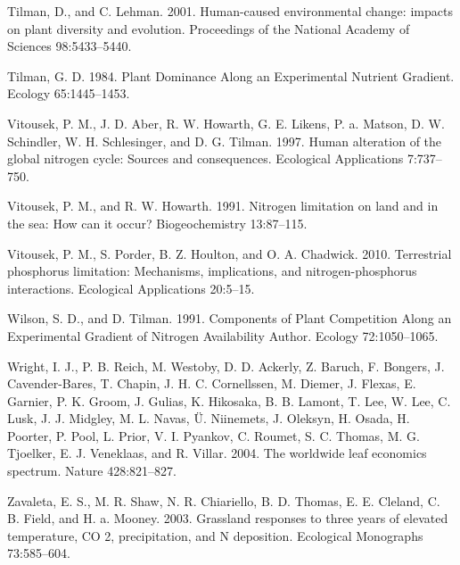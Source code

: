 \documentclass[twoside,12pt,final]{ucthesis-CA2012}
\begin{document}
\begin{ucmainmatter}
\leavevmode\hypertarget{ref-Tilman2001}{}%
Tilman, D., and C. Lehman. 2001. Human-caused environmental change: impacts on plant diversity and evolution. Proceedings of the National Academy of Sciences 98:5433--5440.

\leavevmode\hypertarget{ref-Tilman1984}{}%
Tilman, G. D. 1984. Plant Dominance Along an Experimental Nutrient Gradient. Ecology 65:1445--1453.

\leavevmode\hypertarget{ref-Vitousek1997b}{}%
Vitousek, P. M., J. D. Aber, R. W. Howarth, G. E. Likens, P. a. Matson, D. W. Schindler, W. H. Schlesinger, and D. G. Tilman. 1997. Human alteration of the global nitrogen cycle: Sources and consequences. Ecological Applications 7:737--750.

\leavevmode\hypertarget{ref-Vitousek1991}{}%
Vitousek, P. M., and R. W. Howarth. 1991. Nitrogen limitation on land and in the sea: How can it occur? Biogeochemistry 13:87--115.

\leavevmode\hypertarget{ref-Vitousek2010}{}%
Vitousek, P. M., S. Porder, B. Z. Houlton, and O. A. Chadwick. 2010. Terrestrial phosphorus limitation: Mechanisms, implications, and nitrogen-phosphorus interactions. Ecological Applications 20:5--15.

\leavevmode\hypertarget{ref-Wilson1991}{}%
Wilson, S. D., and D. Tilman. 1991. Components of Plant Competition Along an Experimental Gradient of Nitrogen Availability Author. Ecology 72:1050--1065.

\leavevmode\hypertarget{ref-Wright2004}{}%
Wright, I. J., P. B. Reich, M. Westoby, D. D. Ackerly, Z. Baruch, F. Bongers, J. Cavender-Bares, T. Chapin, J. H. C. Cornellssen, M. Diemer, J. Flexas, E. Garnier, P. K. Groom, J. Gulias, K. Hikosaka, B. B. Lamont, T. Lee, W. Lee, C. Lusk, J. J. Midgley, M. L. Navas, Ü. Niinemets, J. Oleksyn, H. Osada, H. Poorter, P. Pool, L. Prior, V. I. Pyankov, C. Roumet, S. C. Thomas, M. G. Tjoelker, E. J. Veneklaas, and R. Villar. 2004. The worldwide leaf economics spectrum. Nature 428:821--827.

\leavevmode\hypertarget{ref-Zavaleta2003}{}%
Zavaleta, E. S., M. R. Shaw, N. R. Chiariello, B. D. Thomas, E. E. Cleland, C. B. Field, and H. a. Mooney. 2003. Grassland responses to three years of elevated temperature, CO 2, precipitation, and N deposition. Ecological Monographs 73:585--604.

\end{ucmainmatter}
\end{document}
